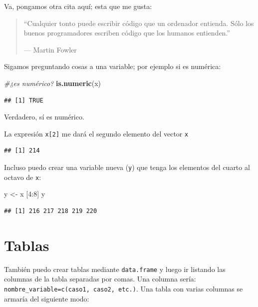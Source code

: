 \documentclass[]{book}
\newenvironment{Shaded}{\begin{snugshade}}{\end{snugshade}}
\newcommand{\KeywordTok}[1]{\textcolor[rgb]{0.13,0.29,0.53}{\textbf{{#1}}}}
\newcommand{\DecValTok}[1]{\textcolor[rgb]{0.00,0.00,0.81}{{#1}}}
\newcommand{\StringTok}[1]{\textcolor[rgb]{0.31,0.60,0.02}{{#1}}}
\newcommand{\CommentTok}[1]{\textcolor[rgb]{0.56,0.35,0.01}{\textit{{#1}}}}
\newcommand{\NormalTok}[1]{{#1}}
\theoremstyle{definition}
\theoremstyle{definition}
\theoremstyle{remark}
\begin{document}
Va, pongamos otra cita aquí; esta que me gusta:

\begin{quote}
``Cualquier tonto puede escribir código que un ordenador entienda. Sólo
los buenos programadores escriben código que los humanos entienden.''

--- Martin Fowler
\end{quote}

Sigamos preguntando cosas a una variable; por ejemplo si es numérica:

\begin{Shaded}
\begin{Highlighting}[]
\CommentTok{#¿es numérico?}
\KeywordTok{is.numeric}\NormalTok{(x) }
\end{Highlighting}
\end{Shaded}

\begin{verbatim}
## [1] TRUE
\end{verbatim}

Verdadero, sí es numérico.

La expresión \texttt{x{[}2{]}} me dará el segundo elemento del vector
\texttt{x}

\begin{verbatim}
## [1] 214
\end{verbatim}

Incluso puedo crear una variable nueva (\texttt{y}) que tenga los
elementos del cuarto al octavo de \texttt{x}:

\begin{Shaded}
\begin{Highlighting}[]
\NormalTok{y <-}\StringTok{ }\NormalTok{x [}\DecValTok{4}\NormalTok{:}\DecValTok{8}\NormalTok{]}
\NormalTok{y}
\end{Highlighting}
\end{Shaded}

\begin{verbatim}
## [1] 216 217 218 219 220
\end{verbatim}

\section{Tablas}\label{tablas}

También puedo crear tablas mediante \texttt{data.frame} y luego ir
listando las columnas de la tabla separadas por comas. Una columna
sería: \texttt{nombre\_variable=c(caso1,\ caso2,\ etc.)}. Una tabla con
varias columnas se armaría del siguiente modo:
\end{document}
